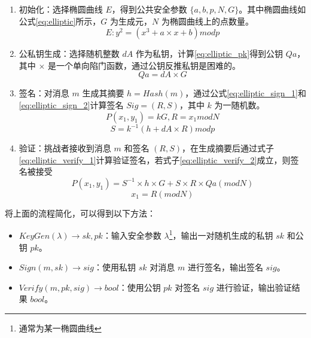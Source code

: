 \begin{enumerate}
    \item 初始化：选择椭圆曲线 $E$，得到公共安全参数 $\{a, b, p, N, G\}$。其中椭圆曲线如公式\eqref{eq:elliptic}所示，$G$ 为生成元，$N$ 为椭圆曲线上的点数量。
    \begin{equation} \label{eq:elliptic} 
        E: y^2 = (x^3 + a \times x + b) mod p
    \end{equation}
    \item 公私钥生成：选择随机整数 $dA$ 作为私钥，计算\eqref{eq:elliptic_pk}得到公钥 $Qa$，其中 $\times$ 是一个单向陷门函数，通过公钥反推私钥是困难的。
    \begin{equation} \label{eq:elliptic_pk}
        Qa = dA \times G
    \end{equation}
    \item 签名：对消息 $m$ 生成其摘要 $h = Hash(m)$，通过公式\eqref{eq:elliptic_sign_1}和\eqref{eq:elliptic_sign_2}计算签名 $Sig = (R, S)$，其中 $k$ 为一随机数。
    \begin{equation} \label{eq:elliptic_sign_1}
        P(x_1, y_1) = kG, R = x_1 mod N
    \end{equation}
    \begin{equation} \label{eq:elliptic_sign_2}
        S = k^{-1} (h + dA \times R) mod p
    \end{equation}
    \item 验证：挑战者接收到消息 $m$ 和签名 $(R, S)$，在生成摘要后通过式子\eqref{eq:elliptic_verify_1}计算验证签名，若式子\eqref{eq:elliptic_verify_2}成立，则签名被接受
    \begin{equation} \label{eq:elliptic_verify_1}
        P(x_1, y_1) = S^{-1} \times h \times G + S \times R \times Qa (mod N)
    \end{equation}
    \begin{equation} \label{eq:elliptic_verify_2}
        x_1 = R (mod N)
    \end{equation}
\end{enumerate}

将上面的流程简化，可以得到以下方法：

\begin{itemize}
    \item $KeyGen(\lambda) \rightarrow sk, pk$：输入安全参数 $\lambda$\footnote{通常为某一椭圆曲线}，输出一对随机生成的私钥 $sk$ 和公钥 $pk$。
    \item $Sign(m, sk) \rightarrow sig$：使用私钥 $sk$ 对消息 $m$ 进行签名，输出签名 $sig$。
    \item $Verify(m, pk, sig) \rightarrow bool$：使用公钥 $pk$ 对签名 $sig$ 进行验证，输出验证结果 $bool$。
\end{itemize}

